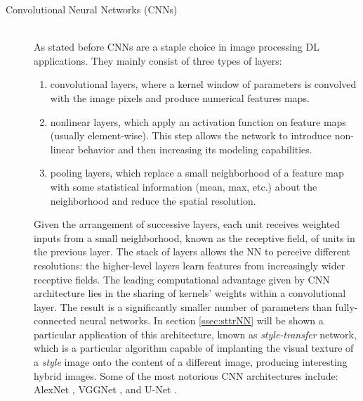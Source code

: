 \begin{description}
    \item [Convolutional Neural Networks (CNNs)] \hfill \\
        As stated before CNNs are a staple choice in image processing DL applications. They mainly consist of three types of layers:

        \begin{enumerate}[i]
            \item convolutional layers, where a kernel window of parameters is convolved with the image pixels and produce numerical features maps.

            \item nonlinear layers, which apply an activation function on feature maps (usually element-wise). This step allows the network to introduce non-linear behavior and then increasing its modeling capabilities.

            \item pooling layers, which replace a small neighborhood of a feature map with some statistical information (mean, max, etc.) about the neighborhood and reduce the spatial resolution.
        \end{enumerate}

        Given the arrangement of successive layers, each unit receives weighted inputs from a small neighborhood, known as the receptive field, of units in the previous layer. The stack of layers allows the NN to perceive different resolutions: the higher-level layers learn features from increasingly wider receptive fields. The leading computational advantage given by CNN architecture lies in the sharing of kernels' weights within a convolutional layer. The result is a significantly smaller number of parameters than fully-connected neural networks. In section \ref{ssec:sttrNN} will be shown a particular application of this architecture, known as \textit{style-transfer} network, which is a particular algorithm capable of implanting the visual texture of a \textit{style} image onto the content of a different image, producing interesting hybrid images. Some of the most notorious CNN architectures include: AlexNet \cite{AlexNet}, VGGNet \cite{1409.1556}, and U-Net \cite{U-net}.
\end{description}

